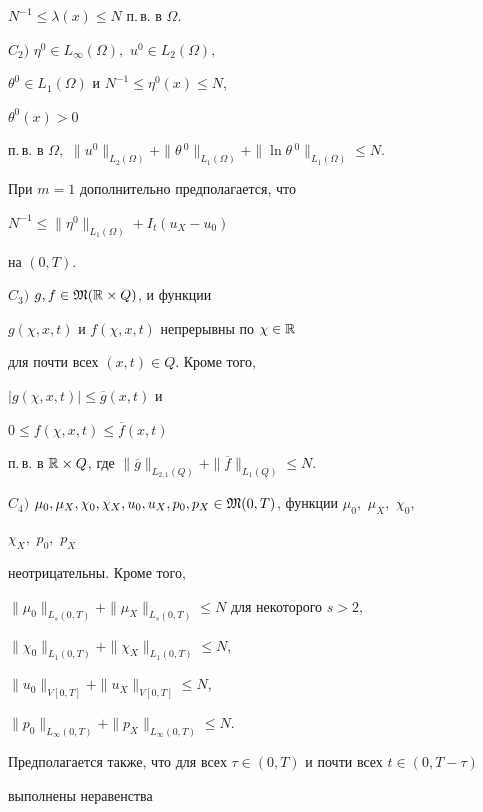 \documentclass[12pt]{article}
\theoremstyle{plain} %
\theoremstyle{definition}
\numberwithin{equation}{section}
\begin{document}
 $N^{-1}\le\lambda(x)\le N$ п.\,в. в $\Omega$.





$C_2)$ $\eta^0\in L_\infty(\Omega),$ $u^0\in L_2(\Omega),$


 $\theta^0\in L_1(\Omega)$ и $N^{-1}\le\eta^0(x)\le N$,


 $\theta^0(x)>0$


 п.\,в. в $\Omega,$ $\|u^0\|_{L_2(\Omega)}+\|\theta\,^0\|_{L_1(\Omega)}+


 \|\ln \theta\,^0\|_{L_1(\Omega)}\le N$.


При $m=1$ дополнительно предполагается, что


$N^{-1}\le\|\eta^0\|_{L_1(\Omega)}+I_t(u_X-u_0)$


на $(0,T).$





$C_3)$ $ g,f\in\frak M(\Bbb R\times Q)$, и функции


$g(\chi,x,t)$ и $f(\chi,x,t)$ непрерывны по $\chi\in \Bbb R$


для почти всех $(x,t)\in Q$. Кроме того,


$|g(\chi,x,t)|\le \overline g(x,t)$ и


$0\le f(\chi,x,t)\le \overline f(x,t)$


п.\,в. в $\Bbb R\times Q$, где $\|\overline g\|_{L_{2,1}(Q)}+


\|\overline f\|_{L_1(Q)}\le N.$





$C_4)$ $\mu_0, \mu_X, \chi_0, \chi_X, u_0, u_X, p_0, p_X


\in \frak M(0,T)$, функции $\mu_0,$ $\mu_X,$ $\chi_0$,


$\chi_X,$ $p_0,$ $p_X$


неотрицательны. Кроме того,


$\|\mu_0\|_{L_s(0,T)}+


\|\mu_X\|_{L_s(0,T)}\le N$ для  некоторого $s>2$,


$\|\chi_0\|_{L_1(0,T)}+\|\chi_X\|_{L_1(0,T)}\le N$,


$\|u_0\|_{V[0,T]}+\|u_X\|_{V[0,T]}\le N$,


$\|p_0\|_{L_\infty (0,T)}+\|p_X\|_{L_\infty (0,T)}\le N$.


Предполагается также, что для всех $\tau\in (0,T)$ и почти всех $t\in (0,T-\tau)$


выполнены неравенства


$$
\end{document}
